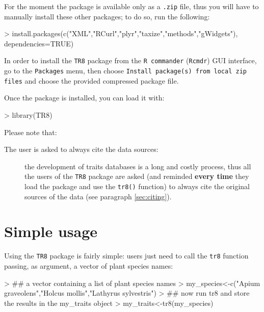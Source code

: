 \documentclass{article}
\begin{document}
   For the moment the package is available only as a \texttt{.zip}
   file, thus you will have to manually install these other packages; to do so, run the following:

\begin{Schunk}
\begin{Sinput}
> install.packages(c("XML","RCurl","plyr","taxize","methods","gWidgets"), dependencies=TRUE)
\end{Sinput}
\end{Schunk}

   
  In order to install the \texttt{TR8} package from the 
  \texttt{R commander} (\texttt{Rcmdr}) GUI interface,  go to the \texttt{Packages} menu,
  then choose \texttt{Install package(s) from local zip files} and choose the
  provided compressed package file.
  
  Once the package is installed, you can load it with:

\begin{Schunk}
\begin{Sinput}
> library(TR8)
\end{Sinput}
\end{Schunk}

Please note that:

\begin{description}
\item[The user is asked to always cite the data sources: ] the
  development of traits databases is a long and costly process,
  thus all the users of the \texttt{TR8} package are asked (and
  reminded \textbf{every time} they load the package and use the \texttt{tr8()} function) to always cite the original sources of the data (see
  paragraph \ref{sec:citing}).
  
\end{description}
  
\section{Simple usage}
\label{sec:usage}

  Using the \texttt{TR8} package is fairly simple: users just need to
  call the \texttt{tr8} function passing, as argument, a vector of
  plant species names:
  
\begin{Schunk}
\begin{Sinput}
> ## a vector containing a list of plant species names
> my_species<-c("Apium graveolens","Holcus mollis","Lathyrus sylvestris")
> ## now run tr8 and store the results in the my_traits object
> my_traits<-tr8(my_species)
\end{Sinput}
\end{Schunk}
\end{document}
